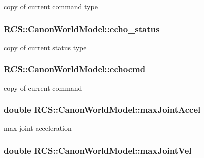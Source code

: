 copy of current command type \hypertarget{structRCS_1_1CanonWorldModel_a59f849abf2987e1745aaf6db68eecb07}{
\subsubsection[{echo\-\_\-status}]{ R\-C\-S\-::\-Canon\-World\-Model\-::echo\-\_\-status}}\label{structRCS_1_1CanonWorldModel_a59f849abf2987e1745aaf6db68eecb07}
copy of current status type \hypertarget{structRCS_1_1CanonWorldModel_ac7e75df0508ec626b834a77ebfe0465f}{
\subsubsection[{echocmd}]{ R\-C\-S\-::\-Canon\-World\-Model\-::echocmd}}\label{structRCS_1_1CanonWorldModel_ac7e75df0508ec626b834a77ebfe0465f}
copy of current command \hypertarget{structRCS_1_1CanonWorldModel_ac20eae577122dd6dc58f92f33c1de53c}{
\subsubsection[{max\-Joint\-Accel}]{\setlength{\rightskip}{0pt plus 5cm}double R\-C\-S\-::\-Canon\-World\-Model\-::max\-Joint\-Accel}}\label{structRCS_1_1CanonWorldModel_ac20eae577122dd6dc58f92f33c1de53c}
max joint acceleration \hypertarget{structRCS_1_1CanonWorldModel_a29c9099062e430196fc659fd7ae2f8ef}{
\subsubsection[{max\-Joint\-Vel}]{\setlength{\rightskip}{0pt plus 5cm}double R\-C\-S\-::\-Canon\-World\-Model\-::max\-Joint\-Vel}}\label{structRCS_1_1CanonWorldModel_a29c9099062e430196fc659fd7ae2f8ef}
